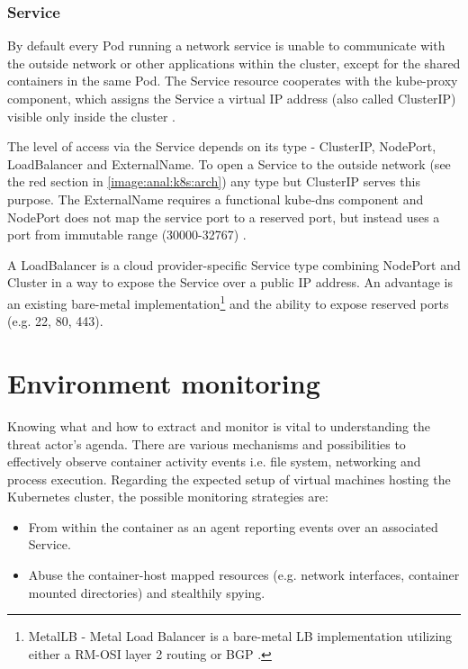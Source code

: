 \subsubsection*{Service \label{anal:k8s:resources:service}}
By default every Pod running a network service is unable to communicate with the outside network or other applications within the cluster, except for the shared containers in the same Pod. The Service resource cooperates with the kube-proxy component, which assigns the Service a virtual IP address (also called ClusterIP) visible only inside the cluster \cite{docs:k8s:concepts:service}.

The level of access via the Service depends on its type - ClusterIP, NodePort, LoadBalancer and ExternalName. To open a Service to the outside network (see the red section in \autoref{image:anal:k8s:arch}) any type but ClusterIP serves this purpose. The ExternalName requires a functional kube-dns component and NodePort does not map the service port to a reserved port, but instead uses a port from immutable range (30000-32767) \cite{docs:k8s:concepts:service}.

A LoadBalancer is a cloud provider-specific Service type combining NodePort and Cluster in a way to expose the Service over a public IP address. An advantage is an existing bare-metal implementation\footnote{MetalLB - Metal Load Balancer is a bare-metal LB implementation utilizing either a RM-OSI layer 2 routing or BGP \cite{docs:metallb}.} and the ability to expose reserved ports (e.g. 22, 80, 443).

\section{Environment monitoring \label{anal:mon}}
Knowing what and how to extract and monitor is vital to understanding the threat actor's agenda. There are various mechanisms and possibilities to effectively observe container activity events i.e. file system, networking and process execution. Regarding the expected setup of virtual machines hosting the Kubernetes cluster, the possible monitoring strategies are:

\begin{itemize}[noitemsep]
	\item From within the container as an agent reporting events over an associated Service.
	\item Abuse the container-host mapped resources (e.g. network interfaces, container mounted directories) and stealthily spying.
\end{itemize}


